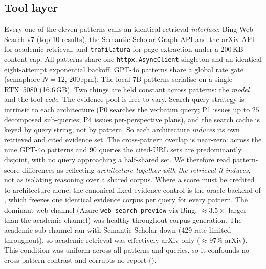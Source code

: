 \documentclass[11pt]{article}
\begin{document}
\subsection{Tool layer}
Every one of the eleven patterns calls an identical retrieval \emph{interface}: Bing Web Search
v7 (top-10 results), the Semantic Scholar Graph API and the arXiv API for academic
retrieval, and \texttt{trafilatura} for page extraction under a 200\,KB content cap.
All patterns share one \texttt{httpx.AsyncClient} singleton and an identical
eight-attempt exponential backoff. GPT-4o patterns share a global rate gate
(semaphore $N{=}12$, $200$\,rpm). The local 7B patterns serialise on a single
RTX~5080 (16.6\,GB). Two things are held constant across patterns: the \emph{model} and the
tool \emph{code}. The evidence pool is free to vary. Search-query strategy is intrinsic to each
architecture (P0 searches the verbatim query; P1 issues up to $25$ decomposed
sub-queries; P4 issues per-perspective plans), and the search cache is keyed by query
string, not by pattern. So each architecture \emph{induces} its own retrieved
and cited evidence set. The cross-pattern overlap is near-zero: across the nine
GPT-4o patterns and $90$ queries the cited-URL sets are predominantly disjoint, with no query
approaching a half-shared set. We therefore read pattern-score differences as reflecting
\emph{architecture together with the retrieval it induces}, not as isolating reasoning over a
shared corpus. Where a score must be credited to architecture alone, the canonical
fixed-evidence control is the oracle backend of , which freezes one
identical evidence corpus per query for every pattern. The dominant web channel (Azure \texttt{web\_search\_preview} via Bing,
$\approx\!3.5\times$ larger than the academic channel) was healthy throughout corpus
generation. The academic sub-channel ran with Semantic Scholar down (429 rate-limited
throughout), so academic retrieval was effectively arXiv-only ($\approx\!97\%$ arXiv).
This condition was uniform across all patterns and queries, so it confounds no
cross-pattern contrast and corrupts no report ().
\end{document}
